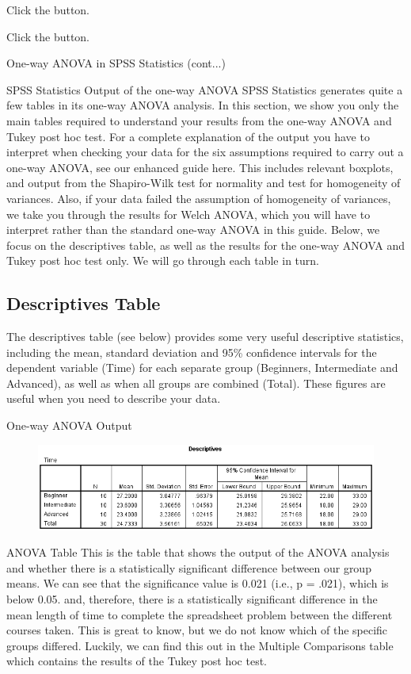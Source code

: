 \documentclass[]{article}
\begin{document}
Click the  button.

Click the  button.

One-way ANOVA in SPSS Statistics (cont...)

SPSS Statistics Output of the one-way ANOVA
SPSS Statistics generates quite a few tables in its one-way ANOVA analysis. In this section, we show you only the main tables required to understand your results from the one-way ANOVA and Tukey post hoc test. For a complete explanation of the output you have to interpret when checking your data for the six assumptions required to carry out a one-way ANOVA, see our enhanced guide here. This includes relevant boxplots, and output from the Shapiro-Wilk test for normality and test for homogeneity of variances. Also, if your data failed the assumption of homogeneity of variances, we take you through the results for Welch ANOVA, which you will have to interpret rather than the standard one-way ANOVA in this guide. Below, we focus on the descriptives table, as well as the results for the one-way ANOVA and Tukey post hoc test only. We will go through each table in turn.

\subsection{Descriptives Table}
The descriptives table (see below) provides some very useful descriptive statistics, including the mean, standard deviation and 95\% confidence intervals for the dependent variable (Time) for each separate group (Beginners, Intermediate and Advanced), as well as when all groups are combined (Total). These figures are useful when you need to describe your data.

One-way ANOVA Output

\begin{figure}
\centering
\includegraphics[width=0.7\linewidth]{images/one-way-anova-output-1}
\caption{}
\label{fig:one-way-anova-output-1}
\end{figure}

ANOVA Table
This is the table that shows the output of the ANOVA analysis and whether there is a statistically significant difference between our group means. We can see that the significance value is 0.021 (i.e., p = .021), which is below 0.05. and, therefore, there is a statistically significant difference in the mean length of time to complete the spreadsheet problem between the different courses taken. This is great to know, but we do not know which of the specific groups differed. Luckily, we can find this out in the Multiple Comparisons table which contains the results of the Tukey post hoc test.
\end{document}
